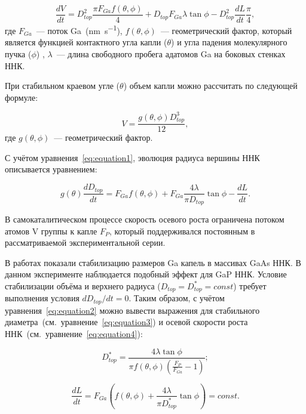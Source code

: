\begin{equation} \label{eq:equation1} \frac{dV}{dt}=D_{top}^2 \frac{\pi F_{Ga}
	f(\theta,\phi)}{4}+ D_{top} F_{Ga} \lambda \tan{\phi} - D_{top}^2 \frac{dL}{dt}
	\frac{\pi}{4},
\end{equation}
где \(F_{Ga}\)~--- поток Ga~(\si{\nano\meter\per\second}),
\(f(\theta,\phi)\)~--- геометрический фактор, который является функцией
контактного угла капли (\(\theta\)) и угла падения молекулярного пучка
(\(\phi\)) \cite{glas2010vapor}, \(\lambda\)~--- длина свободного пробега
адатомов Ga на боковых стенках ННК.

При стабильном краевом угле (\(\theta\)) объем капли можно рассчитать по следующей формуле: 

\begin{equation}
	\label{eq:equation7} V=\frac{g(\theta,\phi)D_{top}^3}{12},
\end{equation}
где \(g(\theta,\phi)\)~--- геометрический фактор.

С учётом уравнения~\ref{eq:equation1}, эволюция радиуса вершины ННК описывается
уравнением:

\begin{equation} \label{eq:equation2} g(\theta) \frac{dD_{top}}{dt}=F_{Ga}
	f(\theta,\phi)+ F_{Ga} \frac{4 \lambda}{\pi D_{top}} \tan{\phi}-\frac{dL}{dt}.
\end{equation}

В самокаталитическом процессе скорость осевого роста ограничена потоком атомов
V группы к капле \(F_P\), который поддерживался постоянным в рассматриваемой
экспериментальной серии.

В работах
\cite{tersoff2015stable,dubrovskii2016regimes,berdnikov2020comparison} показали
стабилизацию размеров Ga капель в массивах GaAs ННК. В данном эксперименте наблюдается подобный эффект для GaP
ННК. Условие стабилизации объёма и верхнего
радиуса (\(D_{top} = D_{top}^\ast = const\)) требует выполнения условия
\(dD_{top} / dt = 0\). Таким образом, с учётом уравнения~\ref{eq:equation2}
можно вывести выражения для стабильного
диаметра~(см.~уравнение~\ref{eq:equation3}) и осевой скорости роста
ННК~(см.~уравнение~\ref{eq:equation4}):

\begin{equation} \label{eq:equation3}
D_{top}^\ast=\frac{4 \lambda \tan{\phi}}{\pi f(\theta,\phi)(\frac{F_{P}}{F_{Ga}} - 1)};
\end{equation}

\begin{equation} \label{eq:equation4} \frac{dL}{dt}=F_{Ga} \left(
	f(\theta,\phi) + \frac{4 \lambda}{\pi D_{top}^\ast}\tan{\phi} \right)=const.
\end{equation}

